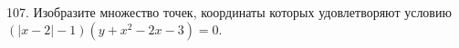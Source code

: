 107. Изобразите множество точек, координаты которых удовлетворяют условию $(|x-2|-1)(y+x^2-2x-3)=0.$\\
